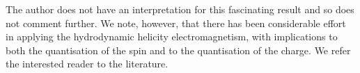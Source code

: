 The author does not have an interpretation for this fascinating result and so does not comment further.
We note, however, that there has been considerable effort in applying the hydrodynamic helicity electromagnetism,
with implications to both the quantisation of the spin and to the quantisation of the charge.
We refer the interested reader to the literature\cite{Trueba1996, Trueba2000, Ranada2002}.








